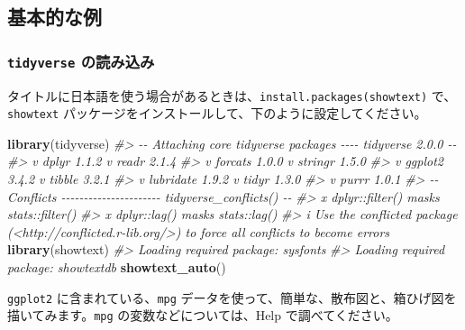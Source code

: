 \documentclass[
  xelatex, ja=standard]{bxjsbook}
\newenvironment{Shaded}{\begin{snugshade}}{\end{snugshade}}
\newcommand{\CommentTok}[1]{\textcolor[rgb]{0.56,0.35,0.01}{\textit{#1}}}
\newcommand{\FunctionTok}[1]{\textcolor[rgb]{0.13,0.29,0.53}{\textbf{#1}}}
\newcommand{\NormalTok}[1]{#1}
\theoremstyle{definition}
\theoremstyle{definition}
\theoremstyle{definition}
\theoremstyle{definition}
\theoremstyle{remark}
\begin{document}
\hypertarget{ux57faux672cux7684ux306aux4f8b}{%
\subsection{基本的な例}\label{ux57faux672cux7684ux306aux4f8b}}

\hypertarget{tidyverse-ux306eux8aadux307fux8fbcux307f}{%
\subsubsection{\texorpdfstring{\texttt{tidyverse} の読み込み}{tidyverse の読み込み}}\label{tidyverse-ux306eux8aadux307fux8fbcux307f}}

タイトルに日本語を使う場合があるときは、\texttt{install.packages(\textquotesingle{}showtext\textquotesingle{})} で、\texttt{showtext} パッケージをインストールして、下のように設定してください。

\begin{Shaded}
\begin{Highlighting}[]
\FunctionTok{library}\NormalTok{(tidyverse)}
\CommentTok{\#\textgreater{} {-}{-} Attaching core tidyverse packages {-}{-}{-}{-} tidyverse 2.0.0 {-}{-}}
\CommentTok{\#\textgreater{} v dplyr     1.1.2     v readr     2.1.4}
\CommentTok{\#\textgreater{} v forcats   1.0.0     v stringr   1.5.0}
\CommentTok{\#\textgreater{} v ggplot2   3.4.2     v tibble    3.2.1}
\CommentTok{\#\textgreater{} v lubridate 1.9.2     v tidyr     1.3.0}
\CommentTok{\#\textgreater{} v purrr     1.0.1     }
\CommentTok{\#\textgreater{} {-}{-} Conflicts {-}{-}{-}{-}{-}{-}{-}{-}{-}{-}{-}{-}{-}{-}{-}{-}{-}{-}{-}{-}{-}{-} tidyverse\_conflicts() {-}{-}}
\CommentTok{\#\textgreater{} x dplyr::filter() masks stats::filter()}
\CommentTok{\#\textgreater{} x dplyr::lag()    masks stats::lag()}
\CommentTok{\#\textgreater{} i Use the conflicted package (\textless{}http://conflicted.r{-}lib.org/\textgreater{}) to force all conflicts to become errors}
\FunctionTok{library}\NormalTok{(showtext) }
\CommentTok{\#\textgreater{} Loading required package: sysfonts}
\CommentTok{\#\textgreater{} Loading required package: showtextdb}
\FunctionTok{showtext\_auto}\NormalTok{()}
\end{Highlighting}
\end{Shaded}

\texttt{ggplot2} に含まれている、\texttt{mpg} データを使って、簡単な、散布図と、箱ひげ図を描いてみます。\texttt{mpg} の変数などについては、Help で調べてください。
\end{document}
